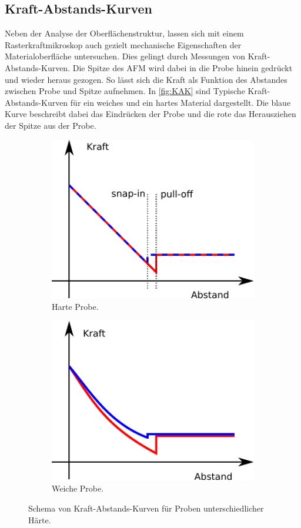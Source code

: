 \subsection{Kraft-Abstands-Kurven}
\label{sec:KAK}
Neben der Analyse der Oberflächenstruktur, lassen sich mit einem Rasterkraftmikroskop auch gezielt mechanische Eigenschaften der Materialoberfläche untersuchen. Dies gelingt durch Messungen von Kraft-Abstands-Kurven. Die Spitze des AFM wird dabei in die Probe hinein gedrückt und wieder heraus gezogen. So lässt sich die Kraft als Funktion des Abstandes zwischen Probe und Spitze aufnehmen.
In \autoref{fig:KAK} sind Typische Kraft-Abstands-Kurven für ein weiches und ein hartes Material dargestellt. Die blaue Kurve beschreibt dabei das Eindrücken der Probe und die rote das Herausziehen der Spitze aus der Probe.
\begin{figure}[H]
  \centering
  \label{fig:KAK}
  \begin{subfigure}{0.45\textwidth}
    \includegraphics{content/plots/harte-theorie.pdf}
    \caption{Harte Probe.}
  \end{subfigure}
  \begin{subfigure}{0.45\textwidth}
    \includegraphics{content/plots/weiche-theorie.pdf}
    \caption{Weiche Probe.}
  \end{subfigure}
  \caption{Schema von Kraft-Abstands-Kurven für Proben unterschiedlicher Härte.}
\end{figure}
